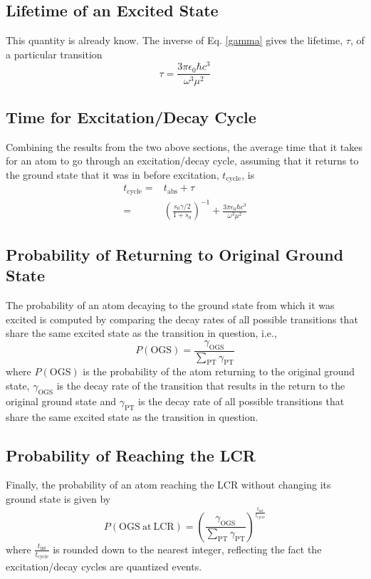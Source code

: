 \subsection{Lifetime of an Excited State}
This quantity is already know. The inverse of Eq. \ref{gamma} gives the lifetime, $\tau$, of a particular transition
\begin{equation}
\tau = \frac{3\pi\epsilon_0\hbar c^3}{\omega^3\mu^2}
\end{equation}

\subsection{Time for Excitation/Decay Cycle}
Combining the results from the two above sections, the average time that it takes for an atom to go through an excitation/decay cycle, assuming that it returns to the ground state that it was in before excitation, $t_{\mathrm{cycle}}$, is
\begin{align}
t_{\mathrm{cycle}} =& t_{\mathrm{abs}}+ \tau\\
=& \left(\frac{s_0\gamma/2}{1+s_0}\right)^{-1} + \frac{3\pi\epsilon_0\hbar c^3}{\omega^3\mu^2}
\end{align}

\subsection{Probability of Returning to Original Ground State}
The probability of an atom decaying to the ground state from which it was excited is computed by comparing the decay rates of all possible transitions that share the same excited state as the transition in question, i.e., 
\begin{equation}
P(\mathrm{OGS}) = \frac{\gamma_{\mathrm{OGS}}}{\sum_{\mathrm{PT}}\gamma_{\mathrm{PT}}}
\end{equation}
where $P(\mathrm{OGS})$ is the probability of the atom returning to the original ground state, $\gamma_{\mathrm{OGS}}$ is the decay rate of the transition that results in the return to the original ground state and $\gamma_{\mathrm{PT}}$ is the decay rate of all possible transitions that share the same excited state as the transition in question.

\subsection{Probability of Reaching the LCR}
Finally, the probability of an atom reaching the LCR without changing its ground state is given by
\begin{equation}
P(\mathrm{OGS\ at\ LCR}) = \left(\frac{\gamma_{\mathrm{OGS}}}{\sum_{\mathrm{PT}}\gamma_{\mathrm{PT}}}\right)^{\frac{t_{\mathrm{int}}}{t_{\mathrm{cycle}}}}
\end{equation}
where $\frac{t_{\mathrm{int}}}{t_{\mathrm{cycle}}}$ is rounded down to the nearest integer, reflecting the fact the excitation/decay cycles are quantized events.

